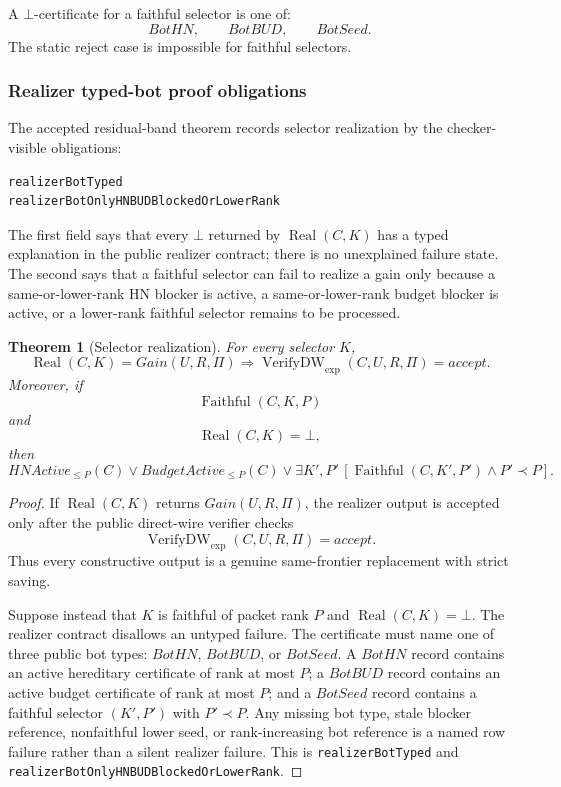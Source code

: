 \documentclass[10.5pt,a4paper]{article}
\newtheorem{theorem}{Theorem}[section]
\newcommand{\Real}{\operatorname{Real}}
\newcommand{\VerifyDW}{\operatorname{VerifyDW}_{\exp}}
\newcommand{\Faithful}{\operatorname{Faithful}}
\newcommand{\Bot}{\bot}
\begin{document}
A \(\Bot\)-certificate for a faithful selector is one of:
\[
BotHN,
\qquad BotBUD,
\qquad BotSeed.
\]
The static reject case is impossible for faithful selectors.

\subsubsection{Realizer typed-bot proof obligations}
The accepted residual-band theorem records selector realization by the checker-visible obligations:
\begin{lstlisting}
realizerBotTyped
realizerBotOnlyHNBUDBlockedOrLowerRank
\end{lstlisting}
The first field says that every \(\Bot\) returned by \(\Real(C,K)\) has a typed explanation in the public realizer contract; there is no unexplained failure state.  The second says that a faithful selector can fail to realize a gain only because a same-or-lower-rank HN blocker is active, a same-or-lower-rank budget blocker is active, or a lower-rank faithful selector remains to be processed.

\begin{theorem}[Selector realization]
For every selector \(K\),
\[
\Real(C,K)=Gain(U,R,\Pi)\Longrightarrow \VerifyDW(C,U,R,\Pi)=accept.
\]
Moreover, if
\[
\Faithful(C,K,P)
\]
and
\[
\Real(C,K)=\Bot,
\]
then
\[
HNActive_{\le P}(C)
\vee
BudgetActive_{\le P}(C)
\vee
\exists K',P'\,[\Faithful(C,K',P')\wedge P'\prec P].
\]
\end{theorem}

\begin{proof}
If \(\Real(C,K)\) returns \(Gain(U,R,\Pi)\), the realizer output is accepted only after the public direct-wire verifier checks
\[
\VerifyDW(C,U,R,\Pi)=accept.
\]
Thus every constructive output is a genuine same-frontier replacement with strict saving.

Suppose instead that \(K\) is faithful of packet rank \(P\) and \(\Real(C,K)=\Bot\).  The realizer contract disallows an untyped failure.  The certificate must name one of three public bot types: \(BotHN\), \(BotBUD\), or \(BotSeed\).  A \(BotHN\) record contains an active hereditary certificate of rank at most \(P\); a \(BotBUD\) record contains an active budget certificate of rank at most \(P\); and a \(BotSeed\) record contains a faithful selector \((K',P')\) with \(P'\prec P\).  Any missing bot type, stale blocker reference, nonfaithful lower seed, or rank-increasing bot reference is a named row failure rather than a silent realizer failure.  This is \texttt{realizerBotTyped} and \texttt{realizerBotOnlyHNBUDBlockedOrLowerRank}.
\end{proof}
\end{document}

